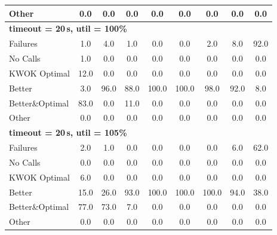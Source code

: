 \begin{tabular}{l cccccccc}
Other & 0.0 & 0.0 & 0.0 & 0.0 & 0.0 & 0.0 & 0.0 & 0.0 \\
\midrule
\multicolumn{9}{l}{\textbf{timeout = 20\,s, util = 100\%}} \\
\midrule
Failures & 1.0 & 4.0 & 1.0 & 0.0 & 0.0 & 2.0 & 8.0 & 92.0 \\
No Calls & 1.0 & 0.0 & 0.0 & 0.0 & 0.0 & 0.0 & 0.0 & 0.0 \\
KWOK Optimal & 12.0 & 0.0 & 0.0 & 0.0 & 0.0 & 0.0 & 0.0 & 0.0 \\
Better & 3.0 & 96.0 & 88.0 & 100.0 & 100.0 & 98.0 & 92.0 & 8.0 \\
Better\&Optimal & 83.0 & 0.0 & 11.0 & 0.0 & 0.0 & 0.0 & 0.0 & 0.0 \\
Other & 0.0 & 0.0 & 0.0 & 0.0 & 0.0 & 0.0 & 0.0 & 0.0 \\
\midrule
\multicolumn{9}{l}{\textbf{timeout = 20\,s, util = 105\%}} \\
\midrule
Failures & 2.0 & 1.0 & 0.0 & 0.0 & 0.0 & 0.0 & 6.0 & 62.0 \\
No Calls & 0.0 & 0.0 & 0.0 & 0.0 & 0.0 & 0.0 & 0.0 & 0.0 \\
KWOK Optimal & 6.0 & 0.0 & 0.0 & 0.0 & 0.0 & 0.0 & 0.0 & 0.0 \\
Better & 15.0 & 26.0 & 93.0 & 100.0 & 100.0 & 100.0 & 94.0 & 38.0 \\
Better\&Optimal & 77.0 & 73.0 & 7.0 & 0.0 & 0.0 & 0.0 & 0.0 & 0.0 \\
Other & 0.0 & 0.0 & 0.0 & 0.0 & 0.0 & 0.0 & 0.0 & 0.0 \\
\bottomrule
\end{tabular}
